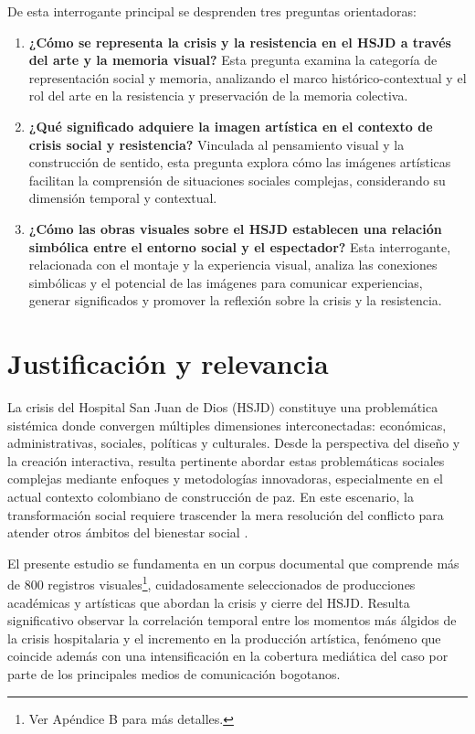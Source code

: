 De esta interrogante principal se desprenden tres preguntas orientadoras:

\begin{enumerate}
    \item \textbf{¿Cómo se representa la crisis y la resistencia en el HSJD a través del arte y la memoria visual?}  
    Esta pregunta examina la categoría de representación social y memoria, analizando el marco histórico-contextual y el rol del arte en la resistencia y preservación de la memoria colectiva.

    \item \textbf{¿Qué significado adquiere la imagen artística en el contexto de crisis social y resistencia?}  
    Vinculada al pensamiento visual y la construcción de sentido, esta pregunta explora cómo las imágenes artísticas facilitan la comprensión de situaciones sociales complejas, considerando su dimensión temporal y contextual.

    \item \textbf{¿Cómo las obras visuales sobre el HSJD establecen una relación simbólica entre el entorno social y el espectador?}  
    Esta interrogante, relacionada con el montaje y la experiencia visual, analiza las conexiones simbólicas y el potencial de las imágenes para comunicar experiencias, generar significados y promover la reflexión sobre la crisis y la resistencia.
\end{enumerate}

\section*{Justificación y relevancia}

La crisis del Hospital San Juan de Dios (HSJD) constituye una problemática sistémica donde convergen múltiples dimensiones interconectadas: económicas, administrativas, sociales, políticas y culturales. Desde la perspectiva del diseño y la creación interactiva, resulta pertinente abordar estas problemáticas sociales complejas mediante enfoques y metodologías innovadoras, especialmente en el actual contexto colombiano de construcción de paz. En este escenario, la transformación social requiere trascender la mera resolución del conflicto para atender otros ámbitos del bienestar social \parencite[p. 313]{Capra1998}.

El presente estudio se fundamenta en un corpus documental que comprende más de 800 registros visuales\footnote{Ver Apéndice B para más detalles.}, cuidadosamente seleccionados de producciones académicas y artísticas que abordan la crisis y cierre del HSJD. Resulta significativo observar la correlación temporal entre los momentos más álgidos de la crisis hospitalaria y el incremento en la producción artística, fenómeno que coincide además con una intensificación en la cobertura mediática del caso por parte de los principales medios de comunicación bogotanos.

